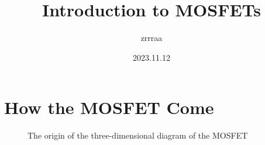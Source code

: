 \documentclass[fontset=windows]{article}
\title{\heiti\zihao{2} Introduction to MOSFETs}
\author{\songti zrrraa}
\date{2023.11.12}
\begin{document}
\maketitle
\thispagestyle{empty}

\section*{How the MOSFET Come}
\begin{figure}[htbp]
    \centering
    \captionsetup{labelformat=empty}
    \caption{The origin of the three-dimensional diagram of the MOSFET}
    \label{1}
\end{figure}
\end{document}
